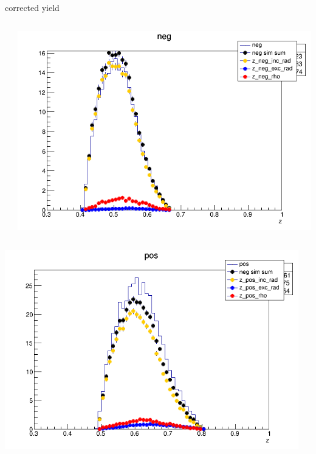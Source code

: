 \begin{frame}{corrected yield}
\begin{columns}
\begin{column}[T]{0.25\textwidth}
\end{column}
\begin{column}[T]{0.25\textwidth}
\includegraphics[width = \textwidth]{results/yield/statistics_corr/yield_x_Q2_z_0.45_3.898_0.50_neg.png}
\end{column}
\end{columns}
\begin{columns}
\begin{column}[T]{0.25\textwidth}
\includegraphics[width = \textwidth]{results/yield/statistics_corr/yield_x_Q2_z_0.45_3.898_0.60_pos.png}
\end{column}
\begin{column}[T]{0.25\textwidth}

\end{column}
\end{columns}
\end{frame}
